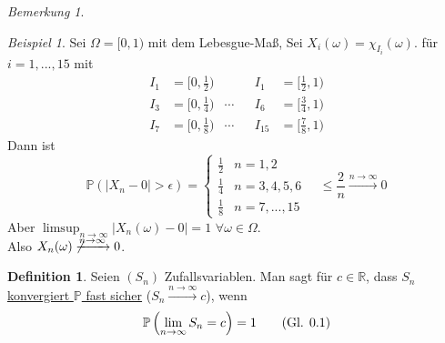 \documentclass[10pt,a4paper]{article}
\newcommand{\R}{\ensuremath{\mathbb{R}}}
\newcommand{\Prb}{\mathbb P}
\theoremstyle{plain}
\theoremstyle{definition}
\newtheorem{definition}[theorem]{Definition}
\theoremstyle{remark}
\newtheorem*{bem*}{Bemerkung}
\newtheorem{exm}[theorem]{Beispiel}
\newcommand{\autotag}{\stepcounter{equation}\tag{Gl. \arabic{section}.\arabic{equation}}}
\begin{document}
	\begin{bem*}
	\end{bem*}

	\begin{exm}
		Sei $\Omega=[0,1)$ mit dem Lebesgue-Maß, Sei $X_i(\omega)=\chi_{I_i}(\omega)$. für $i=1,...,15$ mit
		\begin{align*}
		I_1&=\big[0,\frac{1}{2}\big)&&&I_1&=\big[\frac{1}{2},1\big)\\
		I_3&=\big[0,\frac{1}{4}\big)&\cdots&&I_6&=\big[\frac{3}{4},1\big)\\
		I_7&=\big[0,\frac{1}{8}\big)&\cdots&&I_{15}&=\big[\frac{7}{8},1\big)
		\end{align*}
		Dann ist 
		\[\Prb(|X_n-0|>\epsilon)=\begin{cases}
		\frac{1}{2}&n=1,2\\
		\frac{1}{4}&n=3,4,5,6\\
		\frac{1}{8}&n=7,...,15
		\end{cases}\quad\leq\frac{2}{n}\xrightarrow{n\to\infty}0\]
		Aber $\limsup_{n\to\infty}|X_n(\omega)-0|=1$ $\forall\omega\in\Omega$.\\
		Also $X_n(\omega)\not\xrightarrow{n\to\infty}0$.
	\end{exm}

	\begin{definition}\label{0507def}
		Seien $(S_n)$ Zufallsvariablen. Man sagt für $c\in\R$, dass $S_n$ \underline{konvergiert $\Prb$ fast sicher} ($S_n\xrightarrow{n\to\infty}c$), wenn \[\Prb\left(\lim\limits_{n\to\infty} S_n=c\right)=1\autotag\label{eq:0502}\]
	\end{definition}
	
\end{document}
